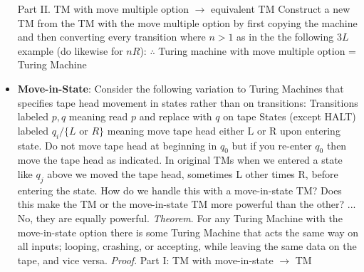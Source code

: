 \documentclass{report}
\begin{document}
\begin{itemize}
            \bigbreak \noindent 
            Part II. TM with move multiple option $\to$ equivalent TM
            \bigbreak \noindent 
            Construct a new TM from the TM with the move multiple option by first copying the machine and then converting every transition where $n>1$ as in the the following $3L$ example (do likewise for $nR$):
            \bigbreak \noindent 
            \bigbreak \noindent 
            $\therefore$ Turing machine with move multiple option = Turing Machine
        \item \textbf{Move-in-State}: Consider the following variation to Turing Machines that specifies tape head movement in states rather than on transitions:
            \bigbreak \noindent 
            \bigbreak \noindent 
            Transitions labeled $p,q$ meaning read $p$ and replace with $q$ on tape
            \bigbreak \noindent 
            States (except HALT) labeled $q_{i} /\{L \text{ or } R\}$ meaning move tape head either L or R upon entering state.
            \bigbreak \noindent 
            Do not move tape head at beginning in $q_{0}$ but if you re-enter $q_{0}$ then move the tape head as indicated.
            \bigbreak \noindent 
            In original TMs when we entered a state like $q_{j}$ above we moved the tape head, sometimes L other times R, before entering the state. How do we handle this with a move-in-state TM?
            \bigbreak \noindent 
            Does this make the TM or the move-in-state TM more powerful than the other? ... No, they are equally powerful.
            \bigbreak \noindent 
            \textit{Theorem}. For any Turing Machine with the move-in-state option there is some Turing Machine that acts the same way on all inputs; looping, crashing, or accepting, while leaving the same data on the tape, and vice versa.
            \bigbreak \noindent 
            \textit{Proof}. Part I: TM with move-in-state $\to$ TM




    \end{itemize}

    \pagebreak 
\end{document}
